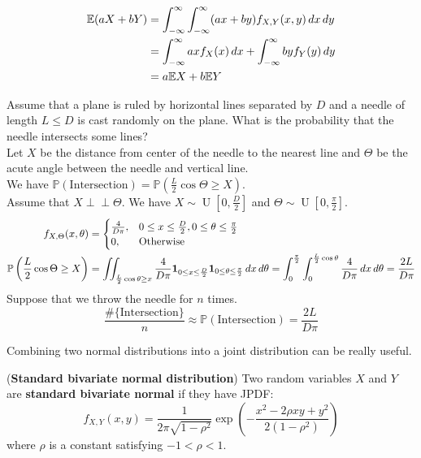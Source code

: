 \documentclass{huhtakm-template-book}
\newcommand{\independent}{\perp\!\!\!\perp}
\newcommand{\prob}{\mathbb{P}}
\newcommand{\expect}{\mathbb{E}}
\DeclareMathOperator{\U}{U}
\begin{document}
    \begin{proofing}
        \begin{align*}
            \expect(aX+bY)&=\intinfty\intinfty(ax+by)f_{X,Y}(x,y)\,dx\,dy\\
            &=\intinfty axf_{X}(x)\,dx+\intinfty byf_{Y}(y)\,dy\\
            &=a\expect X+b\expect Y
        \end{align*}
    \end{proofing}
    
    \newpage
    \begin{eg}
        Assume that a plane is ruled by horizontal lines separated by $D$ and a needle of length $L\leq D$ is cast randomly on the plane. What is the probability that the needle intersects some lines?\\
        Let $X$ be the distance from center of the needle to the nearest line and $\Theta$ be the acute angle between the needle and vertical line.\\
        We have $\prob(\text{Intersection})=\prob\left(\frac{L}{2}\cos\Theta\geq X\right)$.\\
        Assume that $X\independent\Theta$. We have $X\sim\U\left[0,\frac{D}{2}\right]$ and $\Theta\sim\U\left[0,\frac{\pi}{2}\right]$.
        \begin{align*}
            f_{X,\Theta}(x,\theta)&=\begin{cases}
                \frac{4}{D\pi}, &0\leq x\leq\frac{D}{2},0\leq\theta\leq\frac{\pi}{2}\\
                0, &\text{Otherwise}
            \end{cases}\\
            \prob\left(\frac{L}{2}\cos\Theta\geq X\right)&=\iint_{\frac{L}{2}\cos\theta\geq x}\frac{4}{D\pi}\mathbf{1}_{0\leq x\leq\frac{D}{2}}\mathbf{1}_{0\leq\theta\leq\frac{\pi}{2}}\,dx\,d\theta=\intlu{0}{\frac{\pi}{2}}\intlu{0}{\frac{L}{2}\cos\theta}\frac{4}{D\pi}\,dx\,d\theta=\frac{2L}{D\pi}
        \end{align*}
        Suppose that we throw the needle for $n$ times.
        \begin{equation*}
            \frac{\#\{\text{Intersection}\}}{n}\approx\prob(\text{Intersection})=\frac{2L}{D\pi}
        \end{equation*}
    \end{eg}
    Combining two normal distributions into a joint distribution can be really useful.
    \begin{eg}(\textbf{Standard bivariate normal distribution}) 
        Two random variables $X$ and $Y$ are \textbf{standard bivariate normal} if they have JPDF:
        \begin{equation*}
            f_{X,Y}(x,y)=\frac{1}{2\pi\sqrt{1-\rho^{2}}}\exp\left(-\frac{x^{2}-2\rho xy+y^{2}}{2(1-\rho^{2})}\right)
        \end{equation*}
        where $\rho$ is a constant satisfying $-1<\rho<1$.
    \end{eg}
\end{document}
